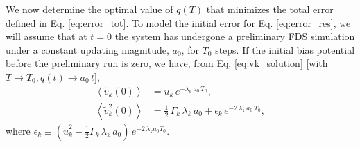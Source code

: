 \documentclass[reprint, superscriptaddress, floatfix]{revtex4-1}
\begin{document}
We now determine the optimal value of $q(T)$
that minimizes the total error defined in Eq. \eqref{eq:error_tot}.
%
To model the initial error for Eq. \eqref{eq:error_res},
we will assume that at $t = 0$
the system has undergone a preliminary FDS simulation
under a constant updating magnitude, $a_0$,
for $T_0$ steps.
%
If the initial bias potential
before the preliminary run is zero,
we have, from Eq. \eqref{eq:vk_solution} [with $T\to T_0, q(t) \to a_0 \, t$],
%
\begin{align}
  \left\langle {\tilde v}_k(0) \right\rangle
  &=
  \tilde u_k \, e^{-\lambda_k \, a_0 \, T_0}
  ,
  \label{eq:xt_eql}
  \\
  \left\langle \tilde v_k^2(0) \right\rangle
  &=
  \frac 1 2 \, \Gamma_k \, \lambda_k \, a_0
  +
  \epsilon_k \, e^{-2 \, \lambda_k \, a_0 \, T_0}
  ,
  \label{eq:xt2_eql}
\end{align}
%
where
$\epsilon_k \equiv \left(\tilde u_k^2 - \frac{1}{2} \Gamma_k \, \lambda_k \, a_0\right) \, e^{-2\,\lambda_k a_0 T_0}$.
\end{document}
